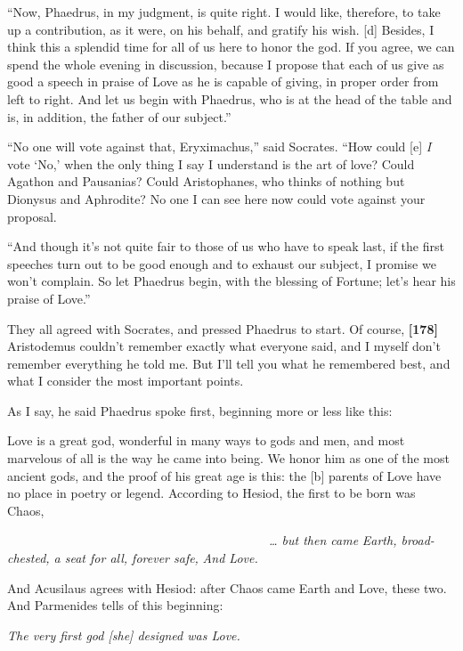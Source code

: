 “Now, Phaedrus, in my judgment, is quite right. I would like, therefore,
to take up a contribution, as it were, on his behalf, and gratify his
wish. {[}d{]} Besides, I think this a splendid time for all of us here
to honor the god. If you agree, we can spend the whole evening in
discussion, because I propose that each of us give as good a speech in
praise of Love as he is capable of giving, in proper order from left to
right. And let us begin with Phaedrus, who is at the head of the table
and is, in addition, the father of our subject.”

“No one will vote against that, Eryximachus,” said Socrates. “How could
{[}e{]} {\em I} vote ‘No,' when the only thing I say I understand is the
art of love? Could Agathon and Pausanias? Could Aristophanes, who thinks
of nothing but Dionysus and Aphrodite? No one I can see here now could
vote against your proposal.

“And though it's not quite fair to those of us who have to speak last,
if the first speeches turn out to be good enough and to exhaust our
subject, I promise we won't complain. So let Phaedrus begin, with the
blessing of Fortune; let's hear his praise of Love.”

They all agreed with Socrates, and pressed Phaedrus to start. Of course,
{\bf {[}178{]}} Aristodemus couldn't remember exactly what everyone
said, and I myself don't remember everything he told me. But I'll tell
you what he remembered best, and what I consider the most important
points.

As I say, he said Phaedrus spoke first, beginning more or less like
this:\crlf
\crlf

Love is a great god, wonderful in many ways to gods and men, and most
marvelous of all is the way he came into being. We honor him as one of
the most ancient gods, and the proof of his great age is this: the
{[}b{]} parents of Love have no place in poetry or legend. According to
Hesiod, the first to be born was Chaos,\crlf
\crlf

~~~~~~~~~~~~~~~~~~~~~~~~~~~~~~~~~~~~~~~~~~{\em \ldots{} but then came}
{\em Earth, broad-chested, a seat for all, forever safe,} {\em And
Love.}\crlf
\crlf

And Acusilaus agrees with Hesiod: after Chaos came Earth and Love, these
two. And Parmenides
tells of this beginning:\crlf
\crlf

{\em The very first god {[}she{]} designed was
Love.}\crlf
\crlf

